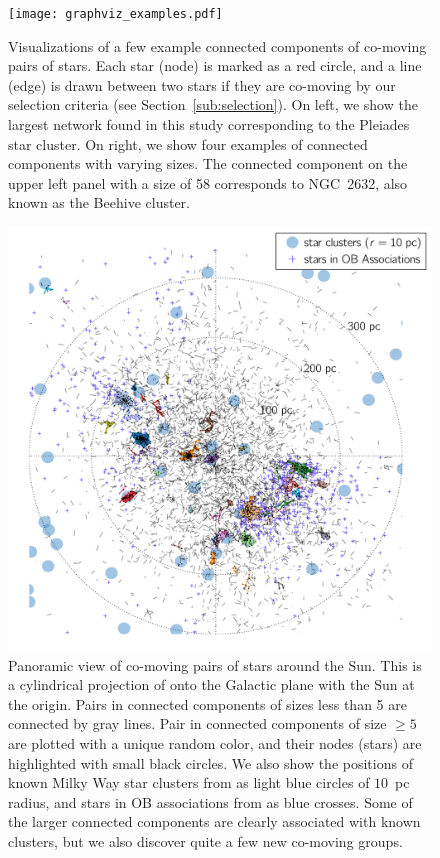 \documentclass[manuscript, letterpaper]{aastex6}
\newcommand{\sectionname}{Section}
\begin{document}
\begin{figure}[htbp]
  \begin{center}
    \texttt{[image: graphviz\_examples.pdf]}
  \end{center}
  \caption{%
    Visualizations of a few example connected components of co-moving pairs of stars.
    Each star (node) is marked as a red circle, and a line (edge) is drawn
    between two stars if they are co-moving by our selection criteria
    (see \sectionname~\ref{sub:selection}). On left, we show the largest network
    found in this study corresponding to the Pleiades star cluster.
    On right, we show four examples of connected components with varying sizes.
    The connected component on the upper left panel with a size of 58 corresponds
    to NGC~2632, also known as the Beehive cluster.
    \label{fig:graphviz_examples}}
\end{figure}

\begin{figure}[htbp]
  \begin{center}
    \includegraphics[width=\textwidth]{glon_d_pie.pdf}
  \end{center}
  \caption{%
    Panoramic view of co-moving pairs of stars around the Sun. This is a cylindrical
    projection of onto the Galactic plane with the Sun at the origin.
    Pairs in connected components of sizes less than 5 are connected by gray lines.
    Pair in connected components of size $\geq 5$ are plotted with a unique random color,
    and their nodes (stars) are highlighted with small black circles.
    We also show the positions of known Milky Way star clusters
    from \citet{Kharchenko:2016aa} as light blue circles of $10$~pc radius,
    and stars in OB associations from \citet{de-Zeeuw:1999aa} as
    blue crosses.
    Some of the larger connected components are clearly associated with known
    clusters, but we also discover quite a few new co-moving groups.
    \label{fig:glon_d_pairlines}}
\end{figure}
\end{document}
